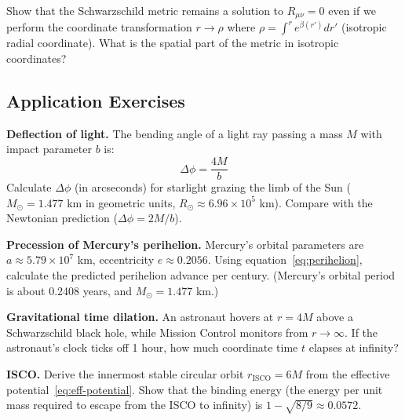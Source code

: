\documentclass[12pt]{article}
\theoremstyle{definition}
\theoremstyle{remark}
\begin{document}
\begin{exbox}[label=ex:derive8]
  Show that the Schwarzschild metric remains a solution to $R_{\mu\nu} = 0$ even if
  we perform the coordinate transformation $r \to \rho$ where $\rho = \int^{r}
  e^{\beta(r')}dr'$ (isotropic radial coordinate). What is the spatial part of the
  metric in isotropic coordinates?
\end{exbox}

\subsection*{Application Exercises}

\begin{exbox}[label=ex:app1]
  \textbf{Deflection of light.} The bending angle of a light ray passing a mass $M$
  with impact parameter $b$ is:
  \begin{equation*}
    \Delta\phi = \frac{4M}{b}
  \end{equation*}
  Calculate $\Delta\phi$ (in arcseconds) for starlight grazing the limb of the Sun
  ($M_{\odot} = 1.477$ km in geometric units, $R_{\odot} \approx 6.96 \times 10^{5}$ km).
  Compare with the Newtonian prediction ($\Delta\phi = 2M/b$).
\end{exbox}

\begin{exbox}[label=ex:app2]
  \textbf{Precession of Mercury's perihelion.} Mercury's orbital parameters are
  $a \approx 5.79 \times 10^{7}$ km, eccentricity $e \approx 0.2056$.
  Using equation~\eqref{eq:perihelion}, calculate the predicted perihelion
  advance per century. (Mercury's orbital period is about 0.2408 years, and
  $M_{\odot} = 1.477$ km.)
\end{exbox}

\begin{exbox}[label=ex:app3]
  \textbf{Gravitational time dilation.} An astronaut hovers at $r = 4M$ above a
  Schwarzschild black hole, while Mission Control monitors from $r \to \infty$.
  If the astronaut's clock ticks off 1 hour, how much coordinate time $t$
  elapses at infinity?
\end{exbox}

\begin{exbox}[label=ex:app4]
  \textbf{ISCO.} Derive the innermost stable circular orbit $r_{\text{ISCO}} = 6M$
  from the effective potential~\eqref{eq:eff-potential}. Show that the binding energy
  (the energy per unit mass required to escape from the ISCO to infinity) is
  $1 - \sqrt{8/9} \approx 0.0572$.
\end{exbox}
\end{document}
